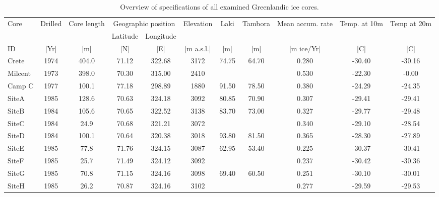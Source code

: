 \documentclass[../../CompleteThesis/Complete_1stDraft.tex]{subfiles}
\begin{document}
	
\begin{table}[ht]
\centering
\begin{adjustbox}{width=1.4\textwidth,center=\textwidth}
	
\begin{tabular}{l*{10}{c}}

	\toprule
	Core &  Drilled &  Core length &    \multicolumn{2}{c}{Geographic position}		&  Elevation &   Laki &  Tambora &  Mean accum. rate &  Temp. at 10m &   Temp at 20m \\ \cmidrule{4-5}
	&&&   Latitude &  Longitude &&&&&&\\
	ID & [Yr] & [m] & [\degree N] & [\degree E] & [m a.s.l.] & [m] & [m] & [m ice/Yr] &[\degree C]&[\degree C]\\
	\midrule
	Crete &     1974 &       404.0 &  71.12 &  322.68 &  3172 &  74.75 &  64.70 &   0.280 & -30.40 & -30.16 \\
	Milcent &     1973 &       398.0 &  70.30 &  315.00 &  2410 &        &        &   0.530 & -22.30 &  -0.00 \\
	Camp C &     1977 &       100.1 &  77.18 &  298.89 &  1880 &  91.50 &  78.50 &   0.380 & -24.29 & -24.35 \\
	SiteA &     1985 &       128.6 &  70.63 &  324.18 &  3092 &  80.85 &  70.90 &   0.307 & -29.41 & -29.41 \\
	SiteB &     1984 &       105.6 &  70.65 &  322.52 &  3138 &  83.70 &  73.00 &   0.327 & -29.77 & -29.48 \\
	SiteC &     1984 &        24.9 &  70.68 &  321.21 &  3072 &        &        &   0.340 & -29.10 & -28.54 \\
	SiteD &     1984 &       100.1 &  70.64 &  320.38 &  3018 &  93.80 &  81.50 &   0.365 & -28.30 & -27.89 \\
	SiteE &     1985 &        77.8 &  71.76 &  324.15 &  3087 &  62.95 &  53.40 &   0.225 & -30.37 & -30.41 \\
	SiteF &     1985 &        25.7 &  71.49 &  324.12 &  3092 &        &        &   0.237 & -30.42 & -30.36 \\
	SiteG &     1985 &        70.8 &  71.15 &  324.16 &  3098 &  69.40 &  60.50 &   0.251 & -30.10 & -30.01 \\
	SiteH &     1985 &        26.2 &  70.87 &  324.16 &  3102 &        &        &   0.277 & -29.59 & -29.53 \\
	\bottomrule
\end{tabular}
\end{adjustbox}
\label{tab:CoreSpecs}
\caption[Ice core Specs]{Overview of specifications of all examined Greenlandic ice cores.}
\end{table}
\end{document}

